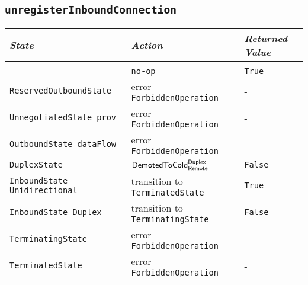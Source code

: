 \documentclass{article}
\def\InitialState{\textbullet}
\def\ReservedOutboundState{\texttt{ReservedOutboundState}}
\def\UnnegotiatedStateAny{\texttt{UnnegotiatedState prov}}
\def\OutboundStateAny{\texttt{OutboundState dataFlow}}
\def\DuplexState{\texttt{DuplexState}}
\def\InboundStateUni{\texttt{InboundState Unidirectional}}
\def\InboundStateDup{\texttt{InboundState Duplex}}
\def\TerminatingState{\texttt{TerminatingState}}
\def\TerminatedState{\texttt{TerminatedState}}
\def\DemotedToColdDupRem{$\text{\textsf{DemotedToCold}}^\text{\textsf{Duplex}}_\text{\textsf{Remote}}$}
\def\True{\texttt{True}}
\def\False{\texttt{False}}
\begin{document}
\subsection{\texttt{unregisterInboundConnection}}
\begin{center}
  \begin{tabular}[h]{lll}
    \textit{State}           & \textit{Action} & \textit{Returned Value}\\\hline\\[2pt]
    \InitialState{}          & \texttt{no-op} & \True \\[8pt]
    \ReservedOutboundState{} & error \texttt{ForbiddenOperation} & - \\[8pt]
    \UnnegotiatedStateAny{}  & error \texttt{ForbiddenOperation} & - \\[8pt]
    \OutboundStateAny{}      & error \texttt{ForbiddenOperation} & - \\[8pt]
    \DuplexState{}           & \DemotedToColdDupRem{}            & \False \\[8pt]
    \InboundStateUni{}       & transition to \TerminatedState{}  & \True \\[8pt]
    \InboundStateDup{}       & transition to \TerminatingState{} & \False \\[8pt]
    \TerminatingState{}      & error \texttt{ForbiddenOperation} & - \\[8pt]
    \TerminatedState{}       & error \texttt{ForbiddenOperation} & - \\[8pt]
  \end{tabular}
\end{center}
\end{document}
